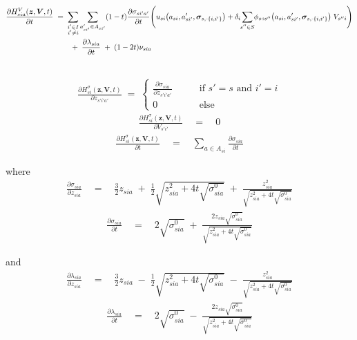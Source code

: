 \documentclass[11pt,fleqn]{article}
\newcommand{\bsigma}{\bm{\sigma}}
\newcommand{\bV}{\bm{V}}
\newcommand{\bz}{\bm{z}}
\newcommand{\shortminus}{{\text{\scalebox{0.4}[1.0]{\(-\)}}}}
\newcommand{\shortrightarrow}{\parbox{4pt}{\tikz{\draw[->](0,0)--(4pt,0);}}}
\begin{document}
\begin{align*}
	\frac{\partial H^V_{sia}(\bz,\bV,t) }{ \partial t } & \;=\; 
	\sum\limits_{\substack{i'\in I \\ i'\neq i}} \sum\limits_{a_{si'}'\in A_{si'}} (1-t) \frac{\partial\sigma_{si'a'}}{\partial t} \Biggl( u_{si}\bigl(a_{si},a_{si'}',\bsigma_{s,\shortminus\{i,i'\}}\bigr) + \delta_i \sum\limits_{\mathclap{s''\in S}} \phi_{s\shortrightarrow s''}\bigl(a_{si},a_{si'}',\bsigma_{s,\shortminus\{i,i'\}}\bigr) \; V_{s''i} \Biggr) \\
	& \qquad \;+\; \frac{\partial\lambda_{sia}}{\partial t} \;+\; (1-2t) \nu_{sia} \\
	& 
\end{align*}

\begin{align*}
	\frac{ \partial H^\sigma_{si}(\bz,\bV,t) }{ \partial z_{s'i'a'}} \;=\; 
	\begin{cases}
		\frac{\partial\sigma_{sia}}{\partial z_{s'i'a'} } \qquad&\text{if } s'=s \text{ and } i'=i \\
		0 \qquad&\text{else}  
	\end{cases}
\end{align*}
\begin{align*}
	\frac{ \partial H^\sigma_{si}(\bz,\bV,t) }{ \partial V_{s'i'} } \quad=\quad 0
\end{align*}
\begin{align*}
	\frac{ \partial H^\sigma_{si}(\bz,\bV,t) }{ \partial t } \quad=\quad \sum\limits_{a\in A_{si}} \frac{\partial\sigma_{sia}}{\partial t}
\end{align*}

where
\begin{align*}
	\frac{\partial\sigma_{sia}}{\partial z_{sia}} \quad=\quad \frac{3}{2} z_{sia} \;+\; \frac{1}{2} \sqrt{z_{sia}^2+4t\sqrt{\sigma^0_{sia}}} \;+\; \frac{z_{sia}^2}{\sqrt{z_{sia}^2+4t\sqrt{\sigma^0_{sia}}}}
\end{align*}
\begin{align*}
	\frac{\partial\sigma_{sia}}{\partial t} \quad=\quad 2\sqrt{\sigma^0_{sia}} \;+\; \frac{2z_{sia}\sqrt{\sigma^0_{sia}}}{\sqrt{z_{sia}^2+4t\sqrt{\sigma^0_{sia}}}}
\end{align*}

and
\begin{align*}
	\frac{\partial\lambda_{sia}}{\partial z_{sia}} \quad=\quad \frac{3}{2} z_{sia} \;-\; \frac{1}{2} \sqrt{z_{sia}^2+4t\sqrt{\sigma^0_{sia}}} \;-\; \frac{z_{sia}^2}{\sqrt{z_{sia}^2+4t\sqrt{\sigma^0_{sia}}}}
\end{align*}
\begin{align*}
	\frac{\partial\lambda_{sia}}{\partial t} \quad=\quad 2\sqrt{\sigma^0_{sia}} \;-\; \frac{2z_{sia}\sqrt{\sigma^0_{sia}}}{\sqrt{z_{sia}^2+4t\sqrt{\sigma^0_{sia}}}}
\end{align*}






\newpage

\end{document}
